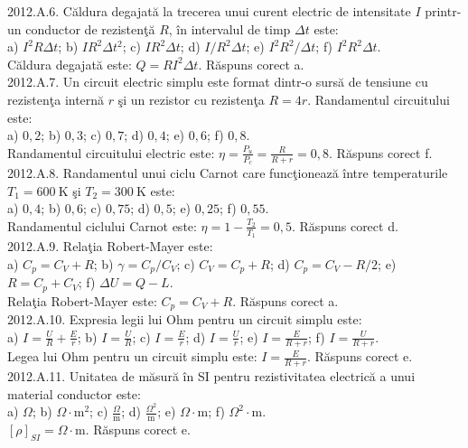 2012.A.6. Căldura degajată la trecerea unui curent electric de intensitate $I$ printr-un conductor de rezistenţă $R$, în intervalul de timp $\Delta t$ este:\\ a) $I^{2} R \Delta t$; b) $I R^{2} \Delta t^{2}$; c) $I R^{2} \Delta t$; d) $I / R^{2} \Delta t$; e) $I^{2} R^{2} / \Delta t$; f) $I^{2} R^{2} \Delta t$.\\ Căldura degajată este: $Q=R I^{2} \Delta t$. Răspuns corect a.\\

2012.A.7. Un circuit electric simplu este format dintr-o sursă de tensiune cu rezistenţa internă $r$ şi un rezistor cu rezistenţa $R=4 r$. Randamentul circuitului este:\\ a) $0,2$; b) $0,3$; c) $0,7$; d) $0,4$; e) $0,6$; f) $0,8$.\\ Randamentul circuitului electric este: $\eta=\frac{P_{u}}{P_{c}}=\frac{R}{R+r}=0,8$. Răspuns corect f.\\

2012.A.8. Randamentul unui ciclu Carnot care funcţionează între temperaturile $T_{1}=600 \mathrm{~K}$ şi $T_{2}=300 \mathrm{~K}$ este:\\ a) $0,4$; b) $0,6$; c) $0,75$; d) $0,5$; e) $0,25$; f) $0,55$.\\ Randamentul ciclului Carnot este: $\eta=1-\frac{T_{2}}{T_{1}}=0,5$. Răspuns corect d.\\

2012.A.9. Relaţia Robert-Mayer este:\\ a) $C_{p}=C_{V}+R$; b) $\gamma=C_{p} / C_{V}$; c) $C_{V}=C_{p}+R$; d) $C_{p}=C_{V}-R / 2$; e) $R=C_{p}+C_{V}$; f) $\Delta U=Q-L$.\\ Relaţia Robert-Mayer este: $C_{p}=C_{V}+R$. Răspuns corect a.\\

2012.A.10. Expresia legii lui Ohm pentru un circuit simplu este:\\ a) $I=\frac{U}{R}+\frac{E}{r}$; b) $I=\frac{U}{R}$; c) $I=\frac{E}{r}$; d) $I=\frac{U}{r}$; e) $I=\frac{E}{R+r}$; f) $I=\frac{U}{R+r}$.\\ Legea lui Ohm pentru un circuit simplu este: $I=\frac{E}{R+r}$. Răspuns corect e.\\

2012.A.11. Unitatea de măsură în SI pentru rezistivitatea electrică a unui material conductor este:\\ a) $\Omega$; b) $\Omega \cdot \mathrm{m}^{2}$; c) $\frac{\Omega}{\mathrm{m}}$; d) $\frac{\Omega^{2}}{\mathrm{m}}$; e) $\Omega \cdot \mathrm{m}$; f) $\Omega^{2} \cdot \mathrm{m}$.\\ $[\rho]_{S I}=\Omega \cdot \mathrm{m}$. Răspuns corect e.\\

